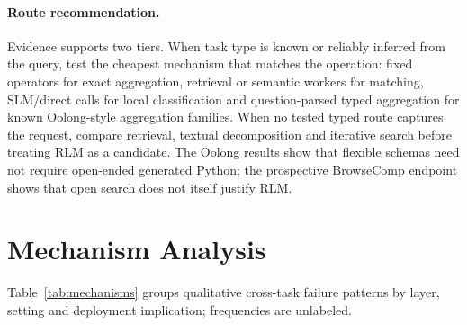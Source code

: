 \documentclass[letterpaper]{article}
\begin{document}
\paragraph{Route recommendation.}
Evidence supports two tiers. When task type is known or reliably inferred from the query, test the cheapest mechanism that matches the operation: fixed operators for exact aggregation, retrieval or semantic workers for matching, SLM/direct calls for local classification and question-parsed typed aggregation for known Oolong-style aggregation families. When no tested typed route captures the request, compare retrieval, textual decomposition and iterative search before treating RLM as a candidate. The Oolong results show that flexible schemas need not require open-ended generated Python; the prospective BrowseComp endpoint shows that open search does not itself justify RLM.

\section{Mechanism Analysis}

Table~\ref{tab:mechanisms} groups qualitative cross-task failure patterns by layer, setting and deployment implication; frequencies are unlabeled.
\end{document}
